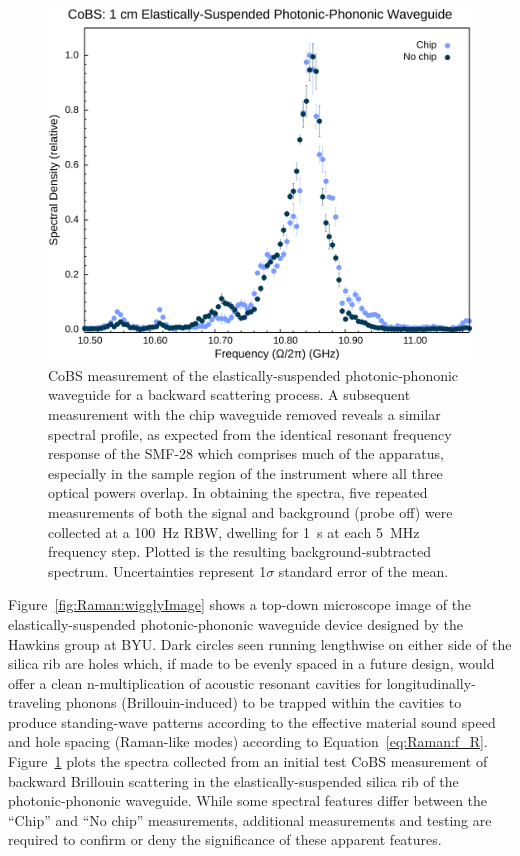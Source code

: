 \begin{figure}[t]
  \centering
  \hspace{-2em}\includegraphics[width=.85\textwidth]{figs/4-Raman/CoBS: 1 cm Elastically-Suspended Photonic-Phononic Waveguide.png}
  \caption[\ac{CoBS} measurement of the elastically-suspended photonic-phononic waveguide for a backward scattering process.]{\ac{CoBS} measurement of the elastically-suspended photonic-phononic waveguide for a backward scattering process. A subsequent measurement with the chip waveguide removed reveals a similar spectral profile, as expected from the identical resonant frequency response of the \ac{SMF-28} which comprises much of the apparatus, especially in the sample region of the instrument where all three optical powers overlap. In obtaining the spectra, five repeated measurements of both the signal and background (probe off) were collected at a \SI{100}{\hertz} \ac{RBW}, dwelling for \SI{1}{\second} at each \SI{5}{\mega\hertz} frequency step. Plotted is the resulting background-subtracted spectrum. Uncertainties represent 1\(\sigma\) standard error of the mean.}
  \label{fig:Raman:wigglyCoBSspectra}
\end{figure}

Figure~\ref{fig:Raman:wigglyImage} shows a top-down microscope image of the elastically-suspended photonic-phononic waveguide device designed by the Hawkins group at \ac{BYU}. Dark circles seen running lengthwise on either side of the silica rib are holes which, if made to be evenly spaced in a future design, would offer a clean n-multiplication of acoustic resonant cavities for longitudinally-traveling phonons (Brillouin-induced) to be trapped within the cavities to produce standing-wave patterns according to the effective material sound speed and hole spacing (Raman-like modes) according to Equation~\ref{eq:Raman:f_R}. Figure~\ref{fig:Raman:wigglyCoBSspectra} plots the spectra collected from an initial test \ac{CoBS} measurement of backward Brillouin scattering in the elastically-suspended silica rib of the photonic-phononic waveguide. While some spectral features differ between the ``Chip'' and ``No chip'' measurements, additional measurements and testing are required to confirm or deny the significance of these apparent features.

